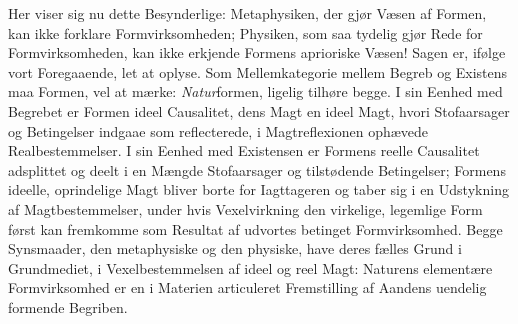 \documentclass[12pt,a4paper]{book}
\begin{document}
Her viser sig nu dette Besynderlige: Metaphysiken, der gjør Væsen af
Formen, kan ikke forklare Formvirksomheden; Physiken, som saa tydelig
gjør Rede for Formvirksomheden, kan ikke erkjende Formens aprioriske
Væsen! Sagen er, ifølge vort Foregaaende, let at oplyse. Som
Mellemkategorie mellem Begreb og Existens maa Formen, vel at mærke:
\emph{Natur}formen, ligelig tilhøre begge. I sin Eenhed med Begrebet er
Formen ideel Causalitet, dens Magt
en ideel Magt, hvori Stofaarsager og Betingelser indgaae som
reflecterede, i Magtreflexionen ophævede Realbestemmelser. I sin Eenhed
med Existensen er Formens reelle Causalitet adsplittet og deelt i en
Mængde Stofaarsager og tilstødende Betingelser; Formens ideelle,
oprindelige Magt bliver borte for Iagttageren og taber sig i en
Udstykning af Magtbestemmelser, under hvis Vexelvirkning den virkelige,
legemlige Form først kan fremkomme som Resultat af udvortes betinget
Formvirksomhed. Begge Synsmaader, den metaphysiske og den physiske, have
deres fælles Grund i Grundmediet, i Vexelbestemmelsen af ideel og reel
Magt: Naturens elementære Formvirksomhed er en i Materien articuleret
Fremstilling af Aandens uendelig formende Begriben.
\end{document}
